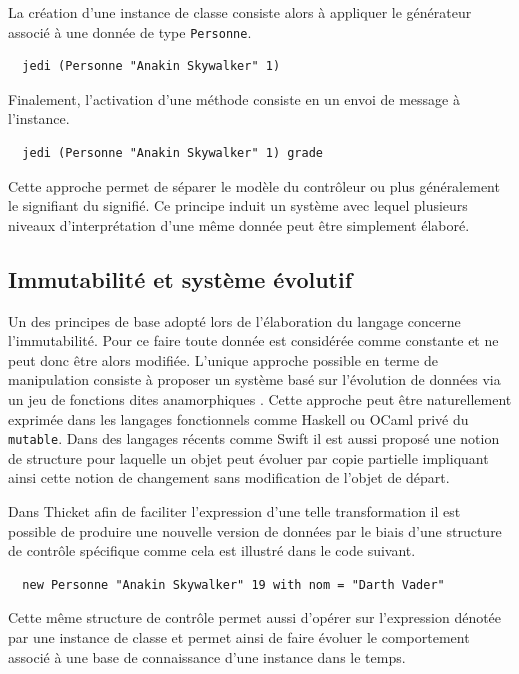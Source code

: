 \documentclass[twoside,a4paper]{article}
\begin{document}
La création  d'une instance  de classe consiste  alors à  appliquer le
générateur associé à une donnée de type {\tt Personne}.

\lstset{language=Thicket}
\begin{lstlisting}
  jedi (Personne "Anakin Skywalker" 1)
\end{lstlisting}

Finalement, l'activation d'une méthode consiste en un envoi de message
à l'instance.

\lstset{language=Thicket}
\begin{lstlisting}
  jedi (Personne "Anakin Skywalker" 1) grade
\end{lstlisting}

Cette  approche permet  de séparer  le  modèle du  contrôleur ou  plus
généralement le signifiant du signifié.  Ce principe induit un système
avec lequel plusieurs niveaux  d'interprétation d'une même donnée peut
être simplement élaboré.

\subsection{Immutabilité et système évolutif}

Un  des principes  de base  adopté  lors de  l'élaboration du  langage
concerne  l'immutabilité. Pour  ce faire  toute donnée  est considérée
comme constante et ne peut donc être alors modifiée. L'unique approche
possible en terme de manipulation  consiste à proposer un système basé
sur l'évolution de données via un jeu de fonctions dites anamorphiques
\cite{meijer1991functional}.  Cette  approche peut  être naturellement
exprimée dans les  langages fonctionnels comme Haskell  ou OCaml privé
du {\tt mutable}.  Dans des  langages récents comme Swift \cite{swift}
il est  aussi proposé une notion  de structure pour laquelle  un objet
peut  évoluer par  copie partielle  impliquant ainsi  cette notion  de
changement sans modification de l'objet de départ.

Dans Thicket afin de faciliter l'expression d'une telle transformation
il est  possible de produire  une nouvelle  version de données  par le
biais d'une structure  de contrôle spécifique comme  cela est illustré
dans le code suivant.

\lstset{language=Thicket}
\begin{lstlisting}
  new Personne "Anakin Skywalker" 19 with nom = "Darth Vader"
\end{lstlisting}

Cette   même  structure   de  contrôle   permet  aussi   d'opérer  sur
l'expression dénotée  par une  instance de classe  et permet  ainsi de
faire évoluer le comportement associé à une base de connaissance d'une
instance dans le temps.
\end{document}
